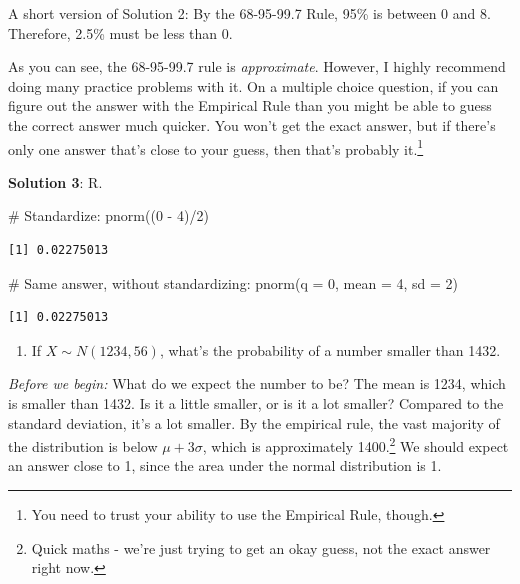 \documentclass[
  letterpaper,
  DIV=11,
  numbers=noendperiod]{scrreprt}
\newenvironment{Shaded}{\begin{snugshade}}{\end{snugshade}}
\newcommand{\AttributeTok}[1]{\textcolor[rgb]{0.40,0.45,0.13}{#1}}
\newcommand{\CommentTok}[1]{\textcolor[rgb]{0.37,0.37,0.37}{#1}}
\newcommand{\DecValTok}[1]{\textcolor[rgb]{0.68,0.00,0.00}{#1}}
\newcommand{\FunctionTok}[1]{\textcolor[rgb]{0.28,0.35,0.67}{#1}}
\newcommand{\NormalTok}[1]{\textcolor[rgb]{0.00,0.23,0.31}{#1}}
\newcommand{\SpecialCharTok}[1]{\textcolor[rgb]{0.37,0.37,0.37}{#1}}
\providecommand{\tightlist}{%
  \setlength{\itemsep}{0pt}\setlength{\parskip}{0pt}}\usepackage{longtable,booktabs,array}
\begin{document}
A short version of Solution 2: By the 68-95-99.7 Rule, 95\% is between 0
and 8. Therefore, 2.5\% must be less than 0.

As you can see, the 68-95-99.7 rule is \emph{approximate}. However, I
highly recommend doing many practice problems with it. On a multiple
choice question, if you can figure out the answer with the Empirical
Rule than you might be able to guess the correct answer much quicker.
You won't get the exact answer, but if there's only one answer that's
close to your guess, then that's probably it.\footnote{You need to trust
  your ability to use the Empirical Rule, though.}

\textbf{Solution 3}: R.

\begin{Shaded}
\begin{Highlighting}[]
\CommentTok{\# Standardize:}
\FunctionTok{pnorm}\NormalTok{((}\DecValTok{0} \SpecialCharTok{{-}} \DecValTok{4}\NormalTok{)}\SpecialCharTok{/}\DecValTok{2}\NormalTok{)}
\end{Highlighting}
\end{Shaded}

\begin{verbatim}
[1] 0.02275013
\end{verbatim}

\begin{Shaded}
\begin{Highlighting}[]
\CommentTok{\# Same answer, without standardizing:}
\FunctionTok{pnorm}\NormalTok{(}\AttributeTok{q =} \DecValTok{0}\NormalTok{, }\AttributeTok{mean =} \DecValTok{4}\NormalTok{, }\AttributeTok{sd =} \DecValTok{2}\NormalTok{)}
\end{Highlighting}
\end{Shaded}

\begin{verbatim}
[1] 0.02275013
\end{verbatim}

\begin{enumerate}
\def\labelenumi{\arabic{enumi}.}
\setcounter{enumi}{1}
\tightlist
\item
  If \(X\sim N(1234, 56)\), what's the probability of a number smaller
  than 1432.
\end{enumerate}

\emph{Before we begin:} What do we expect the number to be? The mean is
1234, which is smaller than 1432. Is it a little smaller, or is it a lot
smaller? Compared to the standard deviation, it's a lot smaller. By the
empirical rule, the vast majority of the distribution is below
\(\mu + 3\sigma\), which is approximately 1400.\footnote{Quick maths -
  we're just trying to get an okay guess, not the exact answer right
  now.} We should expect an answer close to 1, since the area under the
normal distribution is 1.
\end{document}
